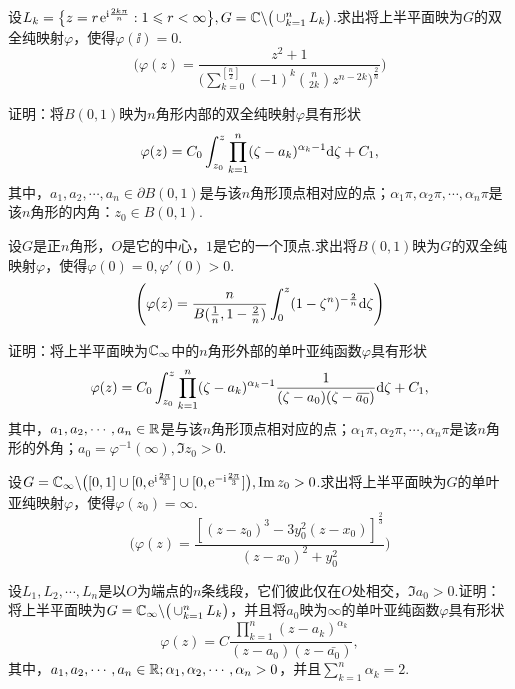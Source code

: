\begin{xiti}
\item 设$L_k=\big\{z=r\ee^{\ii\frac{2k\pi}n}:1\le r<\infty\big\},G=\MC\backslash
\big(\operatorname*{\cup}_{k=1}^nL_k\big)$.求出将上半平面映为$G$的双全纯映射$\varphi$，使得$\varphi(\ii)=0$.
\[\Bigg(\varphi(z)=\frac{z^2+1}{\bigg(\sum_{k=0}^{[\frac n2]}
(-1)^k\binom n{2k}z^{n-2k}\bigg)^{\frac2n}}\Bigg)\]
\item 证明：将$B(0,1)$映为$n$角形内部的双全纯映射$\varphi$具有形状
\[\varphi(z)=C_0\int_{z_0}^z\prod_{k=1}^n(\zeta-a_k)^{\alpha_k-1}\textrm d\zeta+C_1,\]
其中，$a_1,a_2,\cdots,a_n\in\partial B(0,1)$是与该$n$角形顶点相对应的点；$\alpha_1\pi,\alpha_2\pi,\cdots,\alpha_n\pi$是该$n$角形的内角：$z_0\in B(0,1)$.
\item 设$G$是正$n$角形，$O$是它的中心，$1$是它的一个顶点.求出将$B(0,1)$映为$G$的双全纯映射$\varphi$，使得$\varphi(0)=0,\varphi'(0)>0$.
\[\Bigg(\varphi(z)=\frac n{B(\frac1n,1-\frac2n)}\int_0^z(1-\zeta^n)^{-\frac2n}\textrm d\zeta\Bigg)\]
\item 证明：将上半平面映为$\MC_\infty$中的$n$角形外部的单叶亚纯函数$\varphi$具有形状
\[\varphi(z)=C_0\int_{z_0}^z\prod_{k=1}^n(\zeta-a_k)^{\alpha_k-1}
\frac1{(\zeta-a_0)(\zeta-\bar{a_0})}\textrm d\zeta+C_1,\]
其中，$a_1,a_2,\cdots,a_n\in\MR$是与该$n$角形顶点相对应的点；$\alpha_1\pi,\alpha_2\pi,\cdots,\alpha_n\pi$是该$n$角形的外角；$a_0=\varphi^{-1}(\infty),\Im z_0>0$.
\item 设$G=\MC_\infty\backslash\big([0,1]\cup[0,\ee^{\ii\frac{2\pi}3}]\cup
[0,\ee^{-\ii\frac{2\pi}3}]\big),\Im z_0>0$.求出将上半平面映为$G$的单叶亚纯映射$\varphi$，使得$\varphi(z_0)=\infty$.
\[\bigg(\varphi(z)=\frac{[(z-z_0)^3-3y_0^2(z-x_0)]^{\frac23}}{(z-x_0)^2+y_0^2}\bigg)\]
\item 设$L_1,L_2,\cdots,L_n$是以$O$为端点的$n$条线段，它们彼此仅在$O$处相交，$\Im a_0>0$.证明：将上半平面映为$G=\MC_\infty\backslash\big(\operatorname*{\cup}_{k=1}^n
    L_k\big)$，并且将$a_0$映为$\infty$的单叶亚纯函数$\varphi$具有形状
\[\varphi(z)=C\frac{\prod_{k=1}^n(z-a_k)^{\alpha_k}}{(z-a_0)(z-\bar{a_0})},\]
其中，$a_1,a_2,\cdots,a_n\in\MR;\alpha_1,\alpha_2,\cdots,\alpha_n>0$，并且$\sum_{k=1}^n\alpha_k=2$.

\end{xiti}
